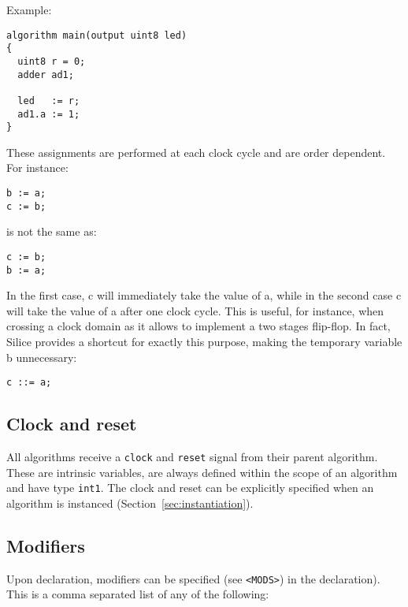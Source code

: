 \documentclass[a4]{article}
\newcommand\silice{Silice}
\begin{document}
\noindent Example:
\begin{verbatim}
algorithm main(output uint8 led)
{
  uint8 r = 0;
  adder ad1;

  led   := r;
  ad1.a := 1;
}
\end{verbatim}

\noindent These assignments are performed at each clock cycle and are order dependent. For instance:
\begin{verbatim}
b := a;
c := b;
\end{verbatim}
is not the same as:
\begin{verbatim}
c := b;
b := a;
\end{verbatim}
In the first case, c will immediately take the value of a, while in the second case
c will take the value of a after one clock cycle. This is useful, for instance, when
crossing a clock domain as it allows to implement a two stages flip-flop. In fact,
\silice{} provides a shortcut for exactly this purpose, making the temporary variable b unnecessary:

\begin{verbatim}
c ::= a;
\end{verbatim}


\subsection{Clock and reset}

All algorithms receive a \texttt{clock} and \texttt{reset} signal from their
parent algorithm. These are intrinsic variables, are always defined within
the scope of an algorithm and have type \texttt{int1}. The clock and reset
can be explicitly specified when an algorithm is instanced (Section~\ref{sec:instantiation}).


\subsection{Modifiers}

Upon declaration, modifiers can be specified (see \texttt{<MODS>}) in the declaration). This is a comma separated list of any of the following:
\end{document}
